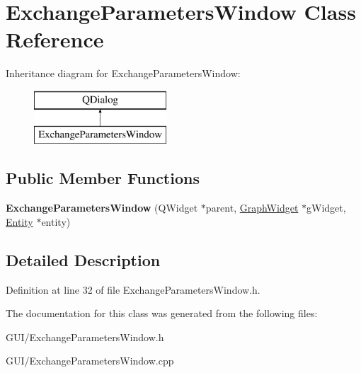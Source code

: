 \hypertarget{class_exchange_parameters_window}{}\section{Exchange\+Parameters\+Window Class Reference}
\label{class_exchange_parameters_window}
Inheritance diagram for Exchange\+Parameters\+Window\+:\begin{figure}[H]
\begin{center}
\leavevmode
\includegraphics[height=2.000000cm]{class_exchange_parameters_window}
\end{center}
\end{figure}
\subsection*{Public Member Functions}
\begin{DoxyCompactItemize}
\item 
\mbox{\label{class_exchange_parameters_window_a4b451fdea195be15351b022de3b8b3fb}} 
{\bfseries Exchange\+Parameters\+Window} (Q\+Widget $\ast$parent, \hyperlink{class_graph_widget}{Graph\+Widget} $\ast$g\+Widget, \hyperlink{class_entity}{Entity} $\ast$entity)
\end{DoxyCompactItemize}


\subsection{Detailed Description}


Definition at line 32 of file Exchange\+Parameters\+Window.\+h.



The documentation for this class was generated from the following files\+:\begin{DoxyCompactItemize}
\item 
G\+U\+I/Exchange\+Parameters\+Window.\+h\item 
G\+U\+I/Exchange\+Parameters\+Window.\+cpp\end{DoxyCompactItemize}
